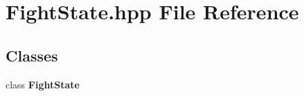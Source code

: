 \section{Fight\-State.\-hpp File Reference}
\label{_fight_state_8hpp}
\subsection*{Classes}
\begin{DoxyCompactItemize}
\item 
class {\bf Fight\-State}
\end{DoxyCompactItemize}
